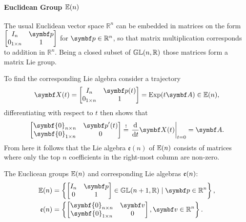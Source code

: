 \paragraph{Euclidean Group ${\mathbb{E}(n)}$}

The usual Euclidean vector space $\mathbb{R}^{n}$ can be embedded in matrices on the form $\begin{bmatrix} I_{n} & \bp \\ 0_{1 \times n} & 1 \end{bmatrix}$ for $\bp \in \mathbb{R}^{n}$, so that matrix multiplication corresponds to addition in $\mathbb{R}^{n}$. Being a closed subset of ${\mathbb{GL}}(n, \mathbb{R})$ those matrices form a matrix Lie group.

To find the corresponding Lie algebra consider a trajectory
\begin{equation}
  \X(t) = \begin{bmatrix} I_{n} & \bp(t) \\ 0_{1 \times n} & 1 \end{bmatrix} = \Exp(t \A) \in \En,
\end{equation}
differentiating with respect to $t$ then shows that
\begin{equation}
  \begin{bmatrix}
    \symbf{0}_{n \times n} & \bp'(t) \\ \symbf{0}_{1 \times n} & 0
  \end{bmatrix} \overset{!}{=} \left.\frac{\mathrm{d}}{\mathrm{d}t} \X(t) \right|_{t = 0} = \A.
\end{equation}
From here it follows that the Lie algebra $\mathfrak{e}(n)$ of ${\mathbb{E}(n)}$ consists of matrices where only the top $n$ coefficients in the right-most column are non-zero.
\begin{important}
  The Euclicean groups ${\mathbb{E}(n)}$ and corresponding Lie algebras ${\mathfrak{e}(n)}$:
  \begin{subequations}
    \begin{align}
      \En             & = \left\{\begin{bmatrix} I_{n} & \bp \\ 0 & 1 \end{bmatrix} \in \GL(n+1, \mathbb{R}) \mid \bp \in \mathbb{R}^{n} \right\}, \\
      \en & = \left\{ \begin{bmatrix} \symbf{0}_{n \times n} & \bv \\ \symbf{0}_{1 \times n} & 0\end{bmatrix}, \bv \in \mathbb{R}^n \right\}.
    \end{align}
  \end{subequations}
\end{important}

